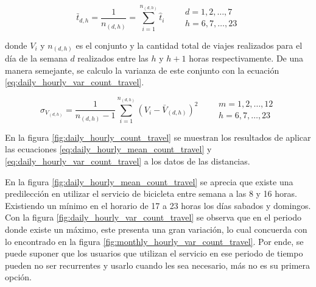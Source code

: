 \begin{equation}
    \bar{t}_{d,h} = \frac{1}{n_{(d,h)}} = \sum_{i=1}^{n_{(d,h)}} \hat{t}_{i} \qquad \begin{matrix}
        d=1,2,\dots,7 \\ h=6,7,\dots,23
    \end{matrix} \label{eq:daily_hourly_mean_count_travel}
\end{equation}

donde $V_i$ y $n_{(d,h)}$ es el conjunto y la cantidad total de viajes realizados para el día de la semana $d$ realizados entre las $h$ y $h+1$ horas respectivamente. De una manera semejante, se calculo la varianza de este conjunto con la ecuación \ref{eq:daily_hourly_var_count_travel}.

\begin{equation}
    \sigma_{V_{(d,h)}} = \frac{1}{n_{(d,h)}-1} \sum_{i=1}^{n_{(d,h)}} (V_i-\bar{V}_{(d,h)})^2 \qquad \begin{matrix}
        m=1,2,\dots,12 \\ h=6,7,\dots,23
    \end{matrix} \label{eq:daily_hourly_var_count_travel}
\end{equation}

En la figura \ref{fig:daily_hourly_count_travel} se muestran los resultados de aplicar las ecuaciones \ref{eq:daily_hourly_mean_count_travel} y \ref{eq:daily_hourly_var_count_travel} a los datos de las distancias.

En la figura \ref{fig:daily_hourly_mean_count_travel} se aprecia que existe una predilección en utilizar el servicio de bicicleta entre semana a las 8 y 16 horas. Existiendo un mínimo en el horario de 17 a 23 horas los días sabados y domingos. Con la figura \ref{fig:daily_hourly_var_count_travel} se observa que en el periodo donde existe un máximo, este presenta una gran variación, lo cual concuerda con lo encontrado en la figura \ref{fig:monthly_hourly_var_count_travel}. Por ende, se puede suponer que los usuarios que utilizan el servicio en ese periodo de tiempo pueden no ser recurrentes y usarlo cuando les sea necesario, más no es su primera opción.

